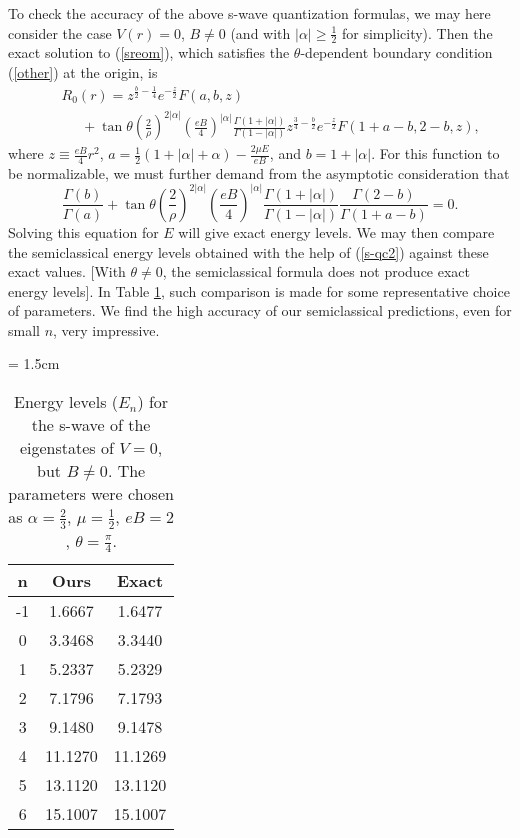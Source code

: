 \documentclass[a4paper,aps,eqsecnum,preprint,preprintnumbers,12pt]{revtex4}
\begin{document}
To check the accuracy of the above s-wave quantization formulas,
we may here consider the case $V(r)=0$, $B \neq 0$ (and with
$|\alpha| \geq \displaystyle \frac{1}{2}$ for simplicity). Then
the exact solution to (\ref{sreom}), which satisfies the
$\theta$-dependent boundary condition (\ref{other}) at the origin,
is
\begin{eqnarray} \label{thend}
&& R_{0}(r) = z^{ \frac{b}{2} - \frac{1}{4} } e^{-\frac{z}{2}}
F(a,b,z) \nonumber \\
&& \;\;\;\;\; + \tan\theta \left( \frac{2}{\rho}
\right)^{2|\alpha|} \left( \frac{eB}{4} \right)^{|\alpha|} \frac{
\Gamma(1+|\alpha|) }{ \Gamma(1-|\alpha|) } z^{ \frac{3}{4} -
\frac{b}{2} } e^{-\frac{z}{2}} F(1+a-b,2-b,z),
\end{eqnarray}
where $z \equiv \displaystyle \frac{eB}{4} r^{2}$, $a =
\displaystyle \frac{1}{2} ( 1 + |\alpha| + \alpha ) - \frac{2\mu
E}{eB}$, and $b = 1 + |\alpha|$. For this function to be
normalizable, we must further demand from the asymptotic
consideration that
\begin{equation}
\frac{\Gamma(b)}{\Gamma(a)} + \tan\theta \left( \frac{2}{\rho}
\right)^{2|\alpha|} \left( \frac{eB}{4} \right)^{|\alpha|} \frac{
\Gamma(1+|\alpha|) }{ \Gamma(1-|\alpha|) }
\frac{\Gamma(2-b)}{\Gamma(1+a-b)} = 0.
\end{equation}
Solving this equation for $E$ will give exact energy levels. We
may then compare the semiclassical energy levels obtained with the
help of (\ref{s-qc2}) against these exact values. [With $\theta
\neq 0$, the semiclassical formula does not produce exact energy
levels]. In Table \ref{tab2}, such comparison is made for some
representative choice of parameters. We find the high accuracy of
our semiclassical predictions, even for small $n$, very
impressive.
\begin{table}[t]
\caption{Energy levels ($E_{n}$) for the s-wave of the eigenstates
of $V=0$, but $B \neq 0$. The parameters were chosen as $\alpha =
\displaystyle \frac{2}{3}$, $\mu = \displaystyle \frac{1}{2}$, $eB
= 2$, $\theta = \displaystyle \frac{\pi}{4}$. \label{tab2}}
\begin{center}
\tabcolsep = 1.5cm
\begin{tabular}{c|cc}
\hline \hline n & Ours & Exact \\ \hline
-1 & 1.6667 & 1.6477 \\
0 & 3.3468 & 3.3440 \\
1 & 5.2337 & 5.2329 \\
2 & 7.1796 & 7.1793 \\
3 & 9.1480 & 9.1478 \\
4 & 11.1270 & 11.1269 \\
5 & 13.1120 & 13.1120 \\
6 & 15.1007 & 15.1007 \\
\hline \hline
\end{tabular}
\end{center}
\end{table}
\end{document}
